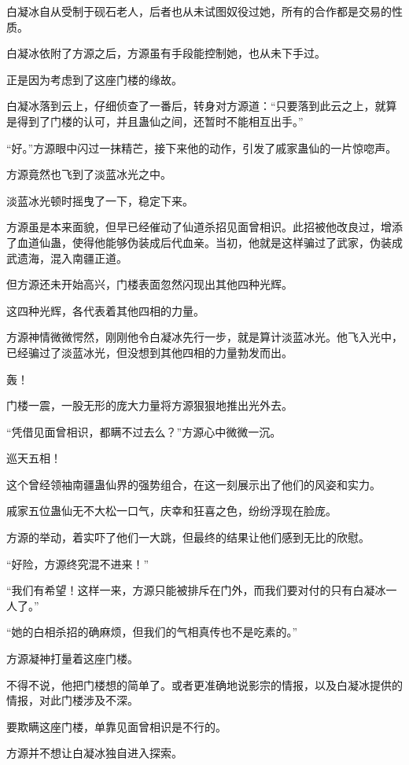 \begin{this_body}
白凝冰自从受制于砚石老人，后者也从未试图奴役过她，所有的合作都是交易的性质。

白凝冰依附了方源之后，方源虽有手段能控制她，也从未下手过。

正是因为考虑到了这座门楼的缘故。

白凝冰落到云上，仔细侦查了一番后，转身对方源道：“只要落到此云之上，就算是得到了门楼的认可，并且蛊仙之间，还暂时不能相互出手。”

“好。”方源眼中闪过一抹精芒，接下来他的动作，引发了戚家蛊仙的一片惊唿声。

方源竟然也飞到了淡蓝冰光之中。

淡蓝冰光顿时摇曳了一下，稳定下来。

方源虽是本来面貌，但早已经催动了仙道杀招见面曾相识。此招被他改良过，增添了血道仙蛊，使得他能够伪装成后代血亲。当初，他就是这样骗过了武家，伪装成武遗海，混入南疆正道。

但方源还未开始高兴，门楼表面忽然闪现出其他四种光辉。

这四种光辉，各代表着其他四相的力量。

方源神情微微愕然，刚刚他令白凝冰先行一步，就是算计淡蓝冰光。他飞入光中，已经骗过了淡蓝冰光，但没想到其他四相的力量勃发而出。

轰！

门楼一震，一股无形的庞大力量将方源狠狠地推出光外去。

“凭借见面曾相识，都瞒不过去么？”方源心中微微一沉。

巡天五相！

这个曾经领袖南疆蛊仙界的强势组合，在这一刻展示出了他们的风姿和实力。

戚家五位蛊仙无不大松一口气，庆幸和狂喜之色，纷纷浮现在脸庞。

方源的举动，着实吓了他们一大跳，但最终的结果让他们感到无比的欣慰。

“好险，方源终究混不进来！”

“我们有希望！这样一来，方源只能被排斥在门外，而我们要对付的只有白凝冰一人了。”

“她的白相杀招的确麻烦，但我们的气相真传也不是吃素的。”

方源凝神打量着这座门楼。

不得不说，他把门楼想的简单了。或者更准确地说影宗的情报，以及白凝冰提供的情报，对此门楼涉及不深。

要欺瞒这座门楼，单靠见面曾相识是不行的。

方源并不想让白凝冰独自进入探索。


\end{this_body}
